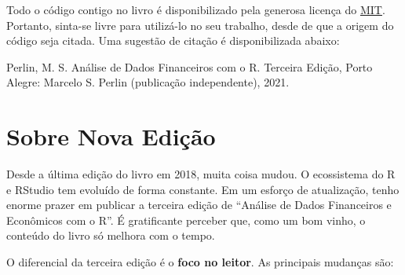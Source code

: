 \documentclass[
  11pt,
]{book}
\begin{document}
Todo o código contigo no livro é disponibilizado pela generosa licença do \href{https://opensource.org/licenses/MIT}{MIT}. Portanto, sinta-se livre para utilizá-lo no seu trabalho, desde de que a origem do código seja citada. Uma sugestão de citação é disponibilizada abaixo:

Perlin, M. S. Análise de Dados Financeiros com o R. Terceira Edição, Porto Alegre: Marcelo S. Perlin (publicação independente), 2021.

{
\setcounter{tocdepth}{2}
\tableofcontents
}
\hypertarget{sobre-nova-ediuxe7uxe3o}{%
\chapter*{Sobre Nova Edição}\label{sobre-nova-ediuxe7uxe3o}}

Desde a última edição do livro em 2018, muita coisa mudou. O ecossistema do R e RStudio tem evoluído de forma constante. Em um esforço de atualização, tenho enorme prazer em publicar a terceira edição de ``Análise de Dados Financeiros e Econômicos com o R''. É gratificante perceber que, como um bom vinho, o conteúdo do livro só melhora com o tempo.

O diferencial da terceira edição é o \textbf{foco no leitor}. As principais mudanças são:
\end{document}
